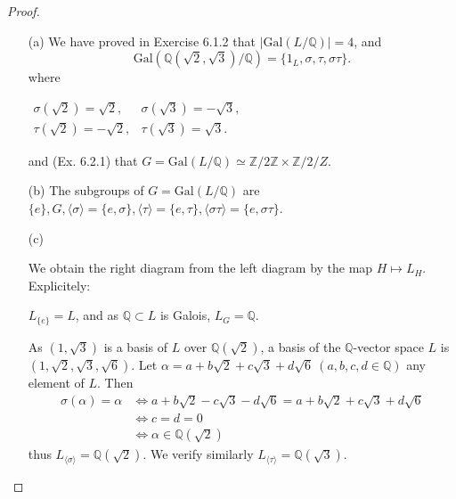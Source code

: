 \documentclass[11pt,a4paper]{article}
\newcommand{\Q}{\mathbb{Q}}
\newcommand{\Z}{\mathbb{Z}}
\newcommand{\Gal}{\mathrm{Gal}}
\begin{document}
\begin{proof}
\begin{enumerate}
\item[(a)]
We have proved in Exercise 6.1.2 that $\vert \Gal(L/\Q) \vert = 4$, and
$$  \mathrm{Gal}(\Q(\sqrt{2},\sqrt{3})/\Q) =\{1_L, \sigma, \tau, \sigma \tau\}.$$
where
\begin{center}
$
\begin{array}{ll}
  \sigma(\sqrt{2}) = \sqrt{2},& \sigma (\sqrt{3}) = -\sqrt{3},   \\
 \tau(\sqrt{2}) = -\sqrt{2},& \tau (\sqrt{3}) = \sqrt{3} .   
\end{array}
$
\end{center}
and (Ex. 6.2.1) that $G = \Gal(L/\Q) \simeq \Z/2\Z \times \Z/2/Z$.

\item[(b)]
The subgroups of $G = \Gal(L/\Q)$ are 
$\{e\}, G, \langle \sigma\rangle = \{e,\sigma\}, \langle \tau\rangle = \{e,\tau\},\langle \sigma \tau \rangle = \{e,\sigma\tau\}.$

\vspace{0.5cm}
\item[(c)]

We obtain the right diagram from the left diagram by the map $H \mapsto L_H$. Explicitely:

$L_{\{e\}} = L$, and as $\Q \subset L$ is Galois, $L_G = \Q$.

As $(1,\sqrt{3})$ is a basis of $L$ over $\Q(\sqrt{2})$, a basis of the $\Q$-vector space $L$ is $(1,\sqrt{2},\sqrt{3},\sqrt{6})$. Let $\alpha  = a+b\sqrt{2} + c\sqrt{3}+d \sqrt{6}\  (a,b,c,d \in \Q)$ any element of $L$.
Then
\begin{align*}
\sigma(\alpha) = \alpha &\iff a+b\sqrt{2} - c\sqrt{3}-d \sqrt{6} = a+b\sqrt{2} + c\sqrt{3}+d \sqrt{6}\\
&\iff c=d=0\\
&\iff \alpha \in \Q(\sqrt{2})
\end{align*}
thus $L_{\langle \sigma \rangle} = \Q(\sqrt{2})$. We verify similarly  $L_{\langle \tau \rangle} = \Q(\sqrt{3})$.


\end{enumerate}
\end{proof}
\end{document}
